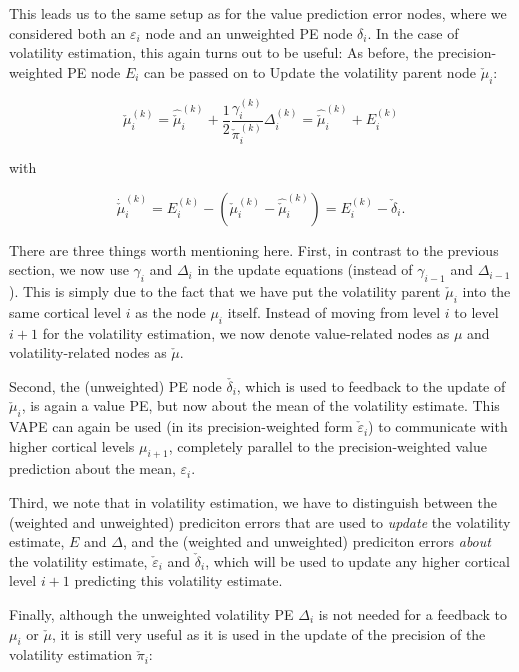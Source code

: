 This leads us to the same setup as for the value prediction error nodes, where we considered both an $\varepsilon_i$ node and an unweighted PE node $\delta_i$. In the case of volatility estimation, this again turns out to be useful: As before, the precision-weighted PE node $E_i$ can be passed on to \textsf{Update} the volatility parent node $\check{\mu}_i$:

\begin{equation}
	\check{\mu}_i^{(k)} = \hat{\check{\mu}}_i^{(k)} + \frac{1}{2} \frac{\gamma_i^{(k)}}{\check{\pi}_i^{(k)}} \Delta_i^{(k)} = \hat{\check{\mu}}_i^{(k)} + E_i^{(k)}
\end{equation}

with 

\begin{equation}
	\dot{\check{\mu}}_i^{(k)} = E_i^{(k)} - (\check{\mu}_i^{(k)} - \hat{\check{\mu}}_i^{(k)}) = E_i^{(k)} - \check{\delta}_i.
\end{equation}

There are three things worth mentioning here. First, in contrast to the previous section, we now use $\gamma_i$ and $\Delta_i$ in the update equations (instead of $\gamma_{i-1}$ and $\Delta_{i-1}$). This is simply due to the fact that we have put the volatility parent $\check{\mu}_i$ into the same cortical level $i$ as the node $\mu_i$ itself. Instead of moving from level $i$ to level $i+1$ for the volatility estimation, we now denote value-related nodes as $\mu$ and volatility-related nodes as $\check{\mu}$.

Second, the (unweighted) PE node $\check{\delta_i}$, which is used to feedback to the update of $\check{\mu}_i$, is again a value PE, but now about the mean of the volatility estimate. This \textsf{VAPE} can again be used (in its precision-weighted form $\check{\varepsilon}_i$) to communicate with higher cortical levels $\mu_{i+1}$, completely parallel to the precision-weighted value prediction about the mean, $\varepsilon_i$.

Third, we note that in volatility estimation, we have to distinguish between the (weighted and unweighted) prediciton errors that are used to \textit{update} the volatility estimate, $E$ and $\Delta$, and the (weighted and unweighted) prediciton errors \textit{about} the volatility estimate, $\check{\varepsilon}_i$ and $\check{\delta}_i$, which will be used to update any higher cortical level $i+1$ predicting this volatility estimate. 

Finally, although the unweighted volatility PE $\Delta_i$ is not needed for a feedback to $\mu_i$ or $\check{\mu}$, it is still very useful as it is used in the update of the precision of the volatility estimation $\check{\pi}_i$:

